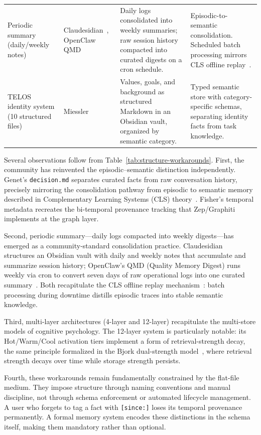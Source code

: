 \begin{table}[!t]
\begin{tabular}{@{}L{3.4cm}L{2.5cm}L{3.7cm}L{3.8cm}@{}}
Periodic summary (daily/weekly notes)
  & Claudesidian~\cite{claudesidian2025}, OpenClaw QMD~\cite{casanova2026}
  & Daily logs consolidated into weekly summaries; raw session history
    compacted into curated digests on a cron schedule.
  & Episodic-to-semantic consolidation.  Scheduled batch processing
    mirrors CLS offline replay~\cite{mcclelland1995}. \\
\addlinespace
TELOS identity system (10 structured files)
  & Miessler~\cite{miessler2024telos}
  & Values, goals, and background as structured Markdown in an
    Obsidian vault, organized by semantic category.
  & Typed semantic store with category-specific schemas, separating
    identity facts from task knowledge. \\
\bottomrule
\end{tabular}
\end{table}

Several observations follow from Table~\ref{tab:structure-workarounds}.
First, the community has reinvented the episodic--semantic distinction
independently.  Genet's \texttt{decision.md} separates curated facts
from raw conversation history, precisely mirroring the consolidation
pathway from episodic to semantic memory described in Complementary
Learning Systems (CLS) theory~\cite{mcclelland1995}.  Fisher's temporal
metadata recreates the bi-temporal provenance tracking that
Zep/Graphiti~\cite{dempsey2025graphiti} implements at the graph layer.

Second, periodic summary---daily logs compacted into weekly
digests---has emerged as a community-standard consolidation practice.
Claudesidian~\cite{claudesidian2025} structures an Obsidian vault with
daily and weekly notes that accumulate and summarize session history;
OpenClaw's QMD (Quality Memory Digest) runs weekly via cron to convert
seven days of raw operational logs into one curated
summary~\cite{casanova2026}.  Both recapitulate the CLS offline replay
mechanism~\cite{mcclelland1995}: batch processing during downtime
distills episodic traces into stable semantic knowledge.

Third, multi-layer architectures (4-layer and 12-layer) recapitulate
the multi-store models of cognitive psychology.  The 12-layer system is
particularly notable: its Hot/Warm/Cool activation tiers implement a
form of retrieval-strength decay, the same principle formalized in the
Bjork dual-strength model~\cite{bjork1992}, where retrieval strength
decays over time while storage strength persists.

Fourth, these workarounds remain fundamentally constrained by the
flat-file medium.  They impose structure through naming conventions and
manual discipline, not through schema enforcement or automated
lifecycle management.  A user who forgets to tag a fact with
\texttt{[since:]} loses its temporal provenance permanently.  A formal
memory system encodes these distinctions in the schema itself, making
them mandatory rather than optional.

